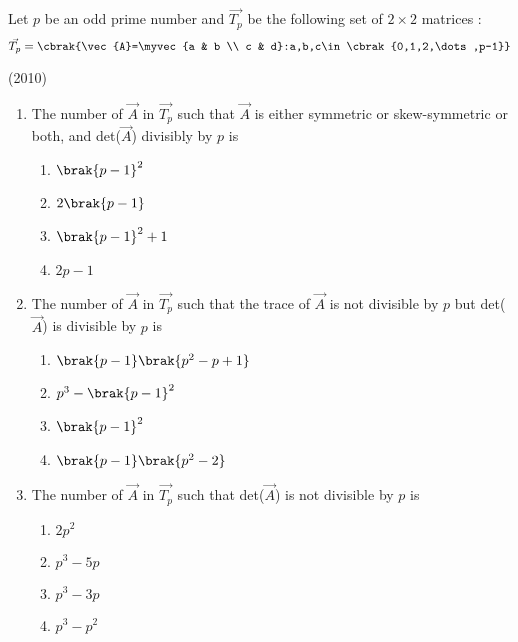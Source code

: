 


	\item Let $p$ be an odd prime number and $\vec{T_p}$ be the following set of $2\times2$ matrices :
	$$\vec{T_p}=\cbrak{\vec{A}=\myvec{a & b \\ c & d}:a,b,c\in\cbrak{0,1,2,\dots,p-1}}$$

			\hfill(2010)
	
	\begin{enumerate}
		\item The number of $\vec{A}$ in $\vec{T_p}$ such that $\vec{A}$ is either symmetric or skew-symmetric or both, and det($\vec{A}$) divisibly by $p$ is
			\begin{enumerate}
				\item $\brak{p-1}^2$
				\item $2\brak{p-1}$
				\item $\brak{p-1}^2+1$
				\item $2p-1$
			\end{enumerate}


		\item The number of $\vec{A}$ in $\vec{T_p}$ such that the trace of $\vec{A}$ is not divisible by $p$ but det($\vec{A}$) is divisible by $p$ is

			
			\begin{enumerate}
				\item $\brak{p-1}\brak{p^2-p+1}$
				\item $p^3-\brak{p-1}^2$
				\item $\brak{p-1}^2$
				\item $\brak{p-1}\brak{p^2-2}$
			\end{enumerate}

		\item The number of $\vec{A}$ in $\vec{T_p}$ such that det($\vec{A}$) is not divisible by $p$ is 
			\begin{enumerate}
				\item $2p^2$
				\item $p^3-5p$
				\item $p^3-3p$
				\item $p^3-p^2$
			\end{enumerate}

	\end{enumerate}
